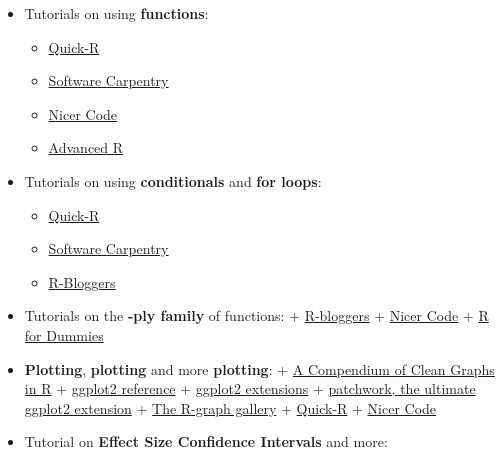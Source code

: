 \documentclass[12pt,]{book}
\providecommand{\tightlist}{%
  \setlength{\itemsep}{0pt}\setlength{\parskip}{0pt}}
\begin{document}
\begin{itemize}
\item
  Tutorials on using \textbf{functions}:

  \begin{itemize}
  \tightlist
  \item
    \href{https://www.statmethods.net/management/userfunctions.html}{Quick-R}
  \item
    \href{https://swcarpentry.github.io/r-novice-inflammation/02-func-R/}{Software Carpentry}
  \item
    \href{https://nicercode.github.io/guides/functions/}{Nicer Code}
  \item
    \href{http://adv-r.had.co.nz/Functions.html}{Advanced R}
  \end{itemize}
\item
  Tutorials on using \textbf{conditionals} and \textbf{for loops}:

  \begin{itemize}
  \tightlist
  \item
    \href{https://www.statmethods.net/management/controlstructures.html}{Quick-R}
  \item
    \href{https://swcarpentry.github.io/r-novice-inflammation/15-supp-loops-in-depth/}{Software Carpentry}
  \item
    \href{https://www.r-bloggers.com/how-to-write-the-first-for-loop-in-r/}{R-Bloggers}
  \end{itemize}
\item
  Tutorials on the \textbf{-ply family} of functions:
  + \href{https://www.r-bloggers.com/using-apply-sapply-lapply-in-r/}{R-bloggers}
  + \href{https://nicercode.github.io/guides/repeating-things/}{Nicer Code}
  + \href{http://www.dummies.com/programming/r/how-to-use-the-apply-family-of-functions-in-r/}{R for Dummies}
\item
  \textbf{Plotting}, \textbf{plotting} and more \textbf{plotting}:
  + \href{http://shinyapps.org/apps/RGraphCompendium/index.php}{A Compendium of Clean Graphs in R}
  + \href{http://ggplot2.tidyverse.org/reference/}{ggplot2 reference}
  + \href{http://www.ggplot2-exts.org/gallery/}{ggplot2 extensions}
  + \href{https://github.com/thomasp85/patchwork}{patchwork, the ultimate ggplot2 extension}
  + \href{https://www.r-graph-gallery.com}{The R-graph gallery}
  + \href{https://www.statmethods.net/graphs/index.html}{Quick-R}
  + \href{https://nicercode.github.io/guides/plotting/}{Nicer Code}
\item
  Tutorial on \textbf{Effect Size Confidence Intervals} and more:


\end{itemize}
\end{document}
